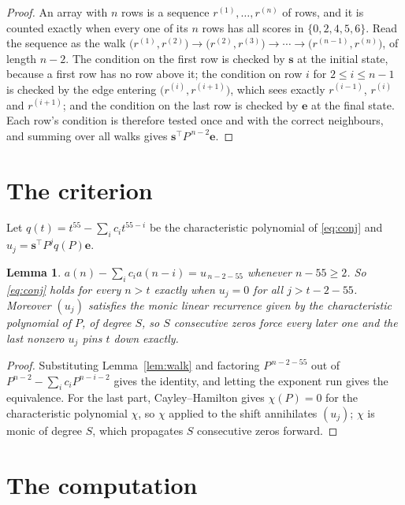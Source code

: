 \documentclass[11pt,a4paper]{article}
\theoremstyle{plain}
\newtheorem{lemma}[theorem]{Lemma}
\theoremstyle{definition}
\begin{document}
\begin{proof}
An array with $n$ rows is a sequence $r^{(1)},\dots,r^{(n)}$ of rows, and it is counted
exactly when every one of its $n$ rows has all scores in $\{0,2,4,5,6\}$. Read the sequence as the
walk $\bigl(r^{(1)},r^{(2)}\bigr)\to\bigl(r^{(2)},r^{(3)}\bigr)\to\cdots\to
\bigl(r^{(n-1)},r^{(n)}\bigr)$, of length $n-2$. The condition on the first row is
checked by $\mathbf{s}$ at the initial state, because a first row has no row above it; the
condition on row $i$ for $2\le i\le n-1$ is checked by the edge entering
$\bigl(r^{(i)},r^{(i+1)}\bigr)$, which sees exactly $r^{(i-1)}$, $r^{(i)}$ and
$r^{(i+1)}$; and the condition on the last row is checked by $\mathbf{e}$ at the final
state. Each row's condition is therefore tested once and with the correct neighbours, and
summing over all walks gives $\mathbf{s}^{\!\top}P^{\,n-2}\mathbf{e}$.
\end{proof}

\section{The criterion}

Let $q(t)=t^{55}-\sum_i c_i t^{55-i}$ be the characteristic polynomial of
\eqref{eq:conj} and $u_j=\mathbf{s}^{\!\top}P^{j}q(P)\mathbf{e}$.

\begin{lemma}\label{lem:crit}
$a(n)-\sum_i c_i a(n-i)=u_{\,n-2-55}$ whenever $n-55\ge2$. So \eqref{eq:conj}
holds for every $n>t$ exactly when $u_j=0$ for all $j>t-2-55$. Moreover $(u_j)$
satisfies the monic linear recurrence given by the characteristic polynomial of $P$, of
degree $S$, so $S$ consecutive zeros force every later one and the last nonzero $u_j$ pins
$t$ down exactly.
\end{lemma}

\begin{proof}
Substituting Lemma~\ref{lem:walk} and factoring $P^{\,n-2-55}$ out of
$P^{n-2}-\sum_i c_i P^{n-i-2}$ gives the identity, and letting the exponent run gives the
equivalence. For the last part, Cayley--Hamilton gives $\chi(P)=0$ for the characteristic
polynomial $\chi$, so $\chi$ applied to the shift annihilates $(u_j)$; $\chi$ is monic of
degree $S$, which propagates $S$ consecutive zeros forward.
\end{proof}

\section{The computation}
\end{document}
